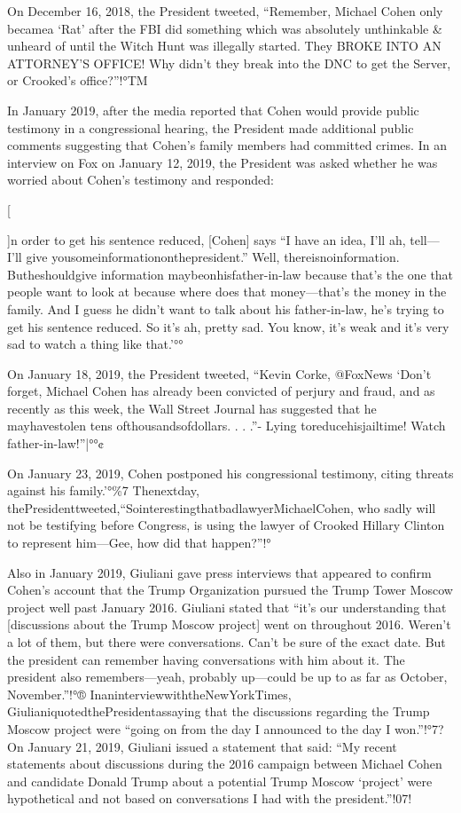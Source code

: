 On December 16, 2018, the President tweeted, “Remember, Michael Cohen only becamea ‘Rat' after the FBI did something which was absolutely unthinkable \& unheard of until the Witch Hunt was illegally started. They BROKE INTO AN ATTORNEY'S OFFICE! Why didn't they break into the DNC to get the Server, or Crooked's office?”!°TM

In January 2019, after the media reported that Cohen would provide public testimony in a congressional hearing, the President made additional public comments suggesting that Cohen's family members had committed crimes. In an interview on Fox on January 12, 2019, the President was asked whether he was worried about Cohen's testimony and responded:

[{]n order to get his sentence reduced, [Cohen] says “I have an idea, I'll ah, tell—I'll give yousomeinformationonthepresident.” Well, thereisnoinformation. Butheshouldgive information maybeonhisfather-in-law because that's the one that people want to look at because where does that money—that's the money in the family. And I guess he didn't want to talk about his father-in-law, he's trying to get his sentence reduced. So it's ah, pretty sad. You know, it's weak and it's very sad to watch a thing like that.'°°

On January 18, 2019, the President tweeted, “Kevin Corke, @FoxNews ‘Don't forget, Michael Cohen has already been convicted of perjury and fraud, and as recently as this week, the Wall Street Journal has suggested that he mayhavestolen tens ofthousandsofdollars. . . .”- Lying toreducehisjailtime! Watch father-in-law!”|°°¢

On January 23, 2019, Cohen postponed his congressional testimony, citing threats against his family.'°\%7 Thenextday, thePresidenttweeted,“SointerestingthatbadlawyerMichaelCohen, who sadly will not be testifying before Congress, is using the lawyer of Crooked Hillary Clinton to represent him—Gee, how did that happen?”!°%

Also in January 2019, Giuliani gave press interviews that appeared to confirm Cohen's account that the Trump Organization pursued the Trump Tower Moscow project well past January 2016. Giuliani stated that “it's our understanding that [discussions about the Trump Moscow project] went on throughout 2016. Weren't a lot of them, but there were conversations. Can't be sure of the exact date. But the president can remember having conversations with him about it.
The president also remembers—yeah, probably up—could be up to as far as October, November.”!°® InaninterviewwiththeNewYorkTimes, GiulianiquotedthePresidentassaying that the discussions regarding the Trump Moscow project were “going on from the day I announced to the day I won.”!°7? On January 21, 2019, Giuliani issued a statement that said: “My recent statements about discussions during the 2016 campaign between Michael Cohen and candidate Donald Trump about a potential Trump Moscow ‘project' were hypothetical and not based on conversations I had with the president.”!07!

}
